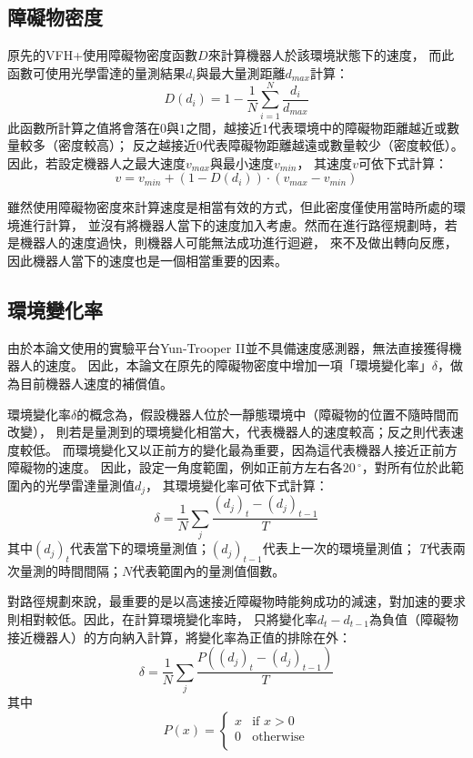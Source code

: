 \subsection{障礙物密度}
原先的VFH+使用障礙物密度函數$D$來計算機器人於該環境狀態下的速度，
而此函數可使用光學雷達的量測結果$d_i$與最大量測距離$d_{max}$計算：
\begin{equation}
	D(d_i) = 1 - \frac{1}{N}\sum_{i=1}^{N}{\frac{d_i}{d_{max}}}
\end{equation}
此函數所計算之值將會落在$0$與$1$之間，越接近$1$代表環境中的障礙物距離越近或數量較多（密度較高）；
反之越接近$0$代表障礙物距離越遠或數量較少（密度較低）。因此，若設定機器人之最大速度$v_{max}$與最小速度$v_{min}$，
其速度$v$可依下式計算：
\begin{equation}
	v = v_{min} + (1-D(d_i)) \cdot (v_{max} - v_{min})
\end{equation}

雖然使用障礙物密度來計算速度是相當有效的方式，但此密度僅使用當時所處的環境進行計算，
並沒有將機器人當下的速度加入考慮。然而在進行路徑規劃時，若是機器人的速度過快，則機器人可能無法成功進行迴避，
來不及做出轉向反應，因此機器人當下的速度也是一個相當重要的因素。

\subsection{環境變化率}
由於本論文使用的實驗平台Yun-Trooper II並不具備速度感測器，無法直接獲得機器人的速度。
因此，本論文在原先的障礙物密度中增加一項「環境變化率」$\delta$，做為目前機器人速度的補償值。

環境變化率$\delta$的概念為，假設機器人位於一靜態環境中（障礙物的位置不隨時間而改變），
則若是量測到的環境變化相當大，代表機器人的速度較高；反之則代表速度較低。
而環境變化又以正前方的變化最為重要，因為這代表機器人接近正前方障礙物的速度。
因此，設定一角度範圍，例如正前方左右各$20\,^{\circ}$，對所有位於此範圍內的光學雷達量測值$d_j$，
其環境變化率可依下式計算：
\begin{equation}
	\delta = \frac{1}{N}\sum_{j}\frac{(d_j)_t - (d_j)_{t-1}}{T}
	\label{e:speed_control}
\end{equation}
其中$(d_j)_t$代表當下的環境量測值；$(d_j)_{t-1}$代表上一次的環境量測值；
$T$代表兩次量測的時間間隔；$N$代表範圍內的量測值個數。

對路徑規劃來說，最重要的是以高速接近障礙物時能夠成功的減速，對加速的要求則相對較低。因此，在計算環境變化率時，
只將變化率$d_t - d_{t-1}$為負值（障礙物接近機器人）的方向納入計算，將變化率為正值的排除在外：
\begin{equation}
	\delta = \frac{1}{N}\sum_{j}\frac{P((d_j)_t - (d_j)_{t-1})}{T}
\end{equation}
其中
\begin{equation*}
	P(x) = 
	\begin{cases}
		x	& \textrm{if } x > 0 \\
		0	& \textrm{otherwise} \\
	\end{cases}
\end{equation*}

